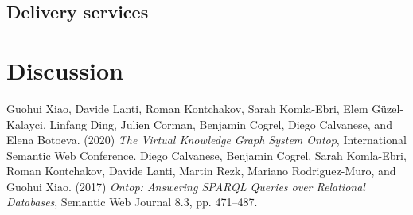 \documentclass{article}
\begin{document}
\subsection{Delivery services}





\section{Discussion}



\begin{thebibliography}{99}
Guohui Xiao, Davide Lanti, Roman Kontchakov, Sarah Komla-Ebri, Elem Güzel-Kalayci, Linfang Ding, Julien Corman, Benjamin Cogrel, Diego Calvanese, and Elena Botoeva. (2020) \emph{The Virtual Knowledge Graph System Ontop}, International Semantic Web Conference.
Diego Calvanese, Benjamin Cogrel, Sarah Komla-Ebri, Roman Kontchakov, Davide Lanti, Martin Rezk, Mariano Rodriguez-Muro, and Guohui Xiao. (2017) \emph{Ontop: Answering SPARQL Queries over Relational Databases}, Semantic Web Journal 8.3, pp. 471–487.
\end{thebibliography}
\end{document}
